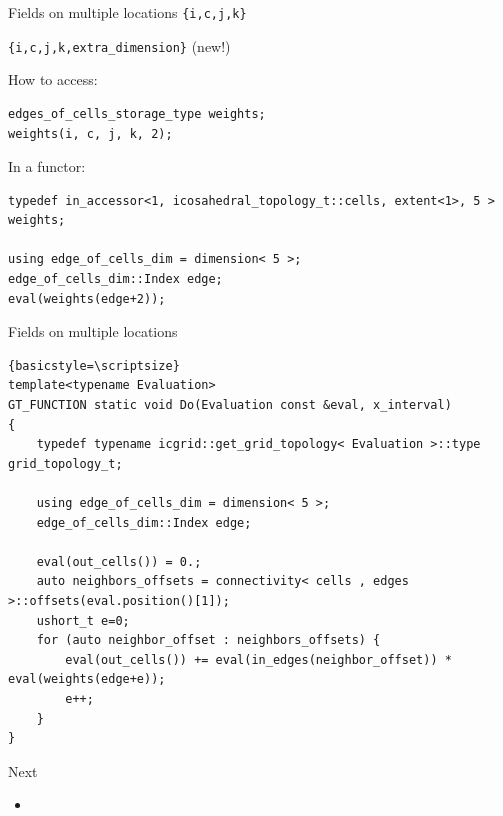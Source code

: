 \documentclass{beamer}
\begin{document}
\begin{frame}[fragile]{Fields on multiple locations}
\texttt{\{i,c,j,k\}}

\texttt{\{i,c,j,k,extra\_dimension\}} (new!)

How to access:
\begin{lstlisting}
edges_of_cells_storage_type weights;
weights(i, c, j, k, 2);
\end{lstlisting}

In a functor:
\begin{lstlisting}
typedef in_accessor<1, icosahedral_topology_t::cells, extent<1>, 5 > weights;

using edge_of_cells_dim = dimension< 5 >;
edge_of_cells_dim::Index edge;
eval(weights(edge+2));
\end{lstlisting}
\end{frame}

\begin{frame}[fragile]{Fields on multiple locations}
\begin{lstlisting}{basicstyle=\scriptsize}
template<typename Evaluation>
GT_FUNCTION static void Do(Evaluation const &eval, x_interval)
{
    typedef typename icgrid::get_grid_topology< Evaluation >::type grid_topology_t;

    using edge_of_cells_dim = dimension< 5 >;
    edge_of_cells_dim::Index edge;

    eval(out_cells()) = 0.;
    auto neighbors_offsets = connectivity< cells , edges >::offsets(eval.position()[1]);
    ushort_t e=0;
    for (auto neighbor_offset : neighbors_offsets) {
        eval(out_cells()) += eval(in_edges(neighbor_offset)) * eval(weights(edge+e));
        e++;
    }
}
\end{lstlisting}
\end{frame}

\begin{frame}{Next}
  \begin{itemize}
    \item
  \end{itemize}
\end{frame}
\end{document}
